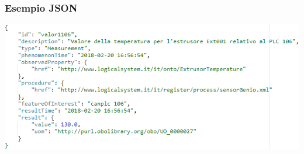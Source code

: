 \documentclass{beamer}
\begin{document}










\begin{frame}
\frametitle{Esempio JSON}
\includegraphics[width=1\textwidth]{images/TemperatureJSON.png}
\end{frame}

%
%
\end{document}
